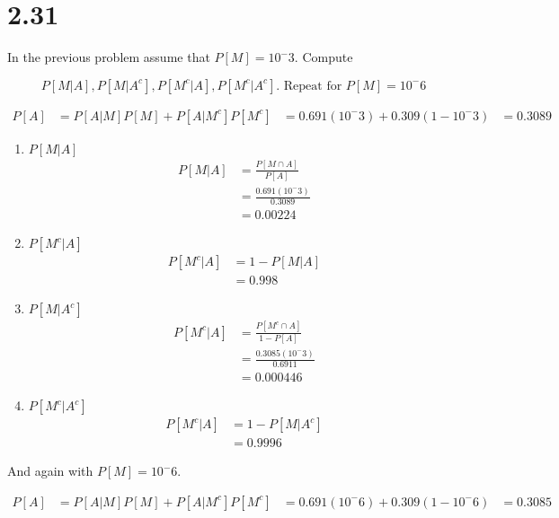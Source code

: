 \documentclass[12pt]{article}
\newcommand{\mysection}[1]{\section*{#1}}
\begin{document}
\mysection{2.31}
In the previous problem assume that $P[M]=10^-3$. Compute

  \[ P[M|A],P[M|A^c],P[M^c|A],P[M^c|A^c]\text{. Repeat for } P[M]=10^-6 \]

  \begin{align*}
    P[A]&=P[A|M]P[M]+P[A|M^c]P[M^c]
        &=0.691(10^-3)+0.309(1-10^-3)
        &=0.3089
  \end{align*}

\begin{enumerate}
  \item $P[M|A]$\\
    \begin{align*}
      P[M|A]&=\frac{P[M\cap A]}{P[A]}\\
            &=\frac{0.691(10^-3)}{0.3089}\\
            &=0.00224
    \end{align*}
  \item $P[M^c|A]$\\
    \begin{align*}
      P[M^c|A]&=1-P[M|A]\\
              &=0.998
    \end{align*}
  \item $P[M|A^c]$\\
    \begin{align*}
      P[M^c|A]&=\frac{P[M^c\cap A]}{1-P[A]}\\
            &=\frac{0.3085(10^-3)}{0.6911}\\
            &=0.000446
    \end{align*}
  \item $P[M^c|A^c]$\\
    \begin{align*}
      P[M^c|A]&=1-P[M|A^c]\\
            &=0.9996
    \end{align*}
\end{enumerate}
\newpage

And again with $P[M]=10^-6$.

  \begin{align*}
    P[A]&=P[A|M]P[M]+P[A|M^c]P[M^c]
        &=0.691(10^-6)+0.309(1-10^-6)
        &=0.3085
  \end{align*}
\end{document}
